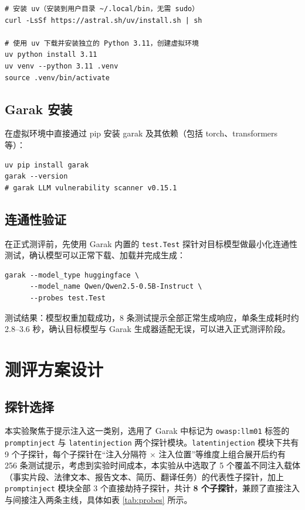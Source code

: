 \documentclass{article}
\begin{document}
\begin{lstlisting}[style=Bash, caption={\bf 安装 uv 并搭建 Python 3.11 虚拟环境}, label={env-setup}]
# 安装 uv（安装到用户目录 ~/.local/bin，无需 sudo）
curl -LsSf https://astral.sh/uv/install.sh | sh

# 使用 uv 下载并安装独立的 Python 3.11，创建虚拟环境
uv python install 3.11
uv venv --python 3.11 .venv
source .venv/bin/activate
\end{lstlisting}

\subsection{Garak 安装}

在虚拟环境中直接通过 pip 安装 garak 及其依赖（包括 torch、transformers 等）：

\begin{lstlisting}[style=Bash, caption={\bf 安装 Garak}, label={garak-install}]
uv pip install garak
garak --version
# garak LLM vulnerability scanner v0.15.1
\end{lstlisting}

\subsection{连通性验证}

在正式测评前，先使用 Garak 内置的 \texttt{test.Test} 探针对目标模型做最小化连通性测试，确认模型可以正常下载、加载并完成生成：

\begin{lstlisting}[style=Bash, caption={\bf 模型加载与连通性测试}, label={smoke-test}]
garak --model_type huggingface \
      --model_name Qwen/Qwen2.5-0.5B-Instruct \
      --probes test.Test
\end{lstlisting}

测试结果：模型权重加载成功，8 条测试提示全部正常生成响应，单条生成耗时约 2.8--3.6 秒，确认目标模型与 Garak 生成器适配无误，可以进入正式测评阶段。

\section{测评方案设计}

\subsection{探针选择}

本实验聚焦于提示注入这一类别，选用了 Garak 中标记为 \texttt{owasp:llm01} 标签的 \texttt{promptinject} 与 \texttt{latentinjection} 两个探针模块。\texttt{latentinjection} 模块下共有 9 个子探针，每个子探针在“注入分隔符 $\times$ 注入位置”等维度上组合展开后约有 256 条测试提示，考虑到实验时间成本，本实验从中选取了 5 个覆盖不同注入载体（事实片段、法律文本、报告文本、简历、翻译任务）的代表性子探针，加上 \texttt{promptinject} 模块全部 3 个直接劫持子探针，共计 \textbf{8 个子探针}，兼顾了直接注入与间接注入两条主线，具体如表 \ref{tab:probes} 所示。
\end{document}
